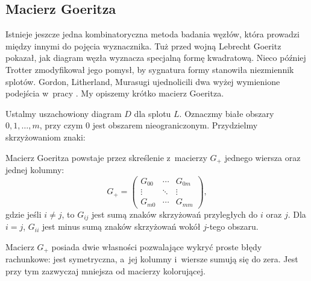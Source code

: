
\subsection{Macierz Goeritza}
%
Istnieje jeszcze jedna kombinatoryczna metoda badania węzłów, która prowadzi między innymi do pojęcia wyznacznika.
Tuż przed wojną Lebrecht Goeritz pokazał, jak diagram węzła wyznacza specjalną formę kwadratową.
%
Nieco później Trotter zmodyfikował jego pomysł, by sygnatura formy stanowiła niezmiennik splotów.
%
Gordon, Litherland, Murasugi ujednolicili dwa wyżej wymienione podejścia w~pracy \cite{litherland81}.
%
%
%
My opiszemy krótko macierz Goeritza.

Ustalmy uszachowiony diagram $D$ dla splotu $L$.
%
Oznaczmy białe obszary $0, 1, \ldots, m$, przy czym $0$ jest obszarem nieograniczonym.
Przydzielmy skrzyżowaniom znaki:
\begin{comment}
\begin{figure}[H]
    \begin{minipage}[b]{.48\linewidth}
    \centering
    \LargePlusCrossingChessboard
    \end{minipage}
    \begin{minipage}[b]{.48\linewidth}
    \centering
    \LargeMinusCrossingChessboard
    \end{minipage}
\end{figure}
\end{comment}

\begin{definition}
    Macierz Goeritza powstaje przez skreślenie z~macierzy $G_+$ jednego wiersza oraz jednej kolumny:
    \begin{equation}
        G_+=\begin{pmatrix}
        G_{00} & \cdots & G_{0m} \\
        \vdots & \ddots & \vdots \\
        G_{m0} & \cdots & G_{mm}
        \end{pmatrix},
    \end{equation}
    gdzie jeśli $i\neq j$, to $G_{ij}$ jest sumą znaków skrzyżowań przyległych do $i$ oraz $j$.
    Dla $i = j$, $G_{ii}$ jest minus sumą znaków skrzyżowań wokół $j$-tego obszaru.
\end{definition}

Macierz $G_+$ posiada dwie własności pozwalające wykryć proste błędy rachunkowe: jest symetryczna, a~jej kolumny i~wiersze sumują się do zera.
Jest przy tym zazwyczaj mniejsza od macierzy kolorującej.

